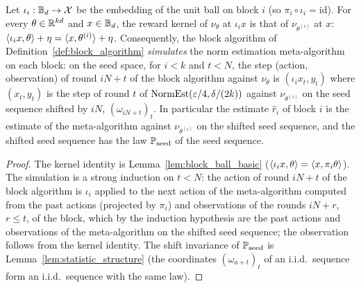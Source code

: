 \begin{lemma}\label{lem:separation_block_embedding}
\leanok
{}
Let $\iota_i : \mathbb{B}_d \to \mathcal{X}$ be the embedding of the unit ball on block $i$ (so
$\pi_i \circ \iota_i = \mathrm{id}$). For every $\theta \in \mathbb{R}^{kd}$ and $x \in \mathbb{B}_d$, the
reward kernel of $\nu_\theta$ at $\iota_i x$ is that of $\nu_{\theta^{(i)}}$ at $x$:
$\langle \iota_i x, \theta \rangle + \eta = \langle x, \theta^{(i)} \rangle + \eta$. Consequently, the block
algorithm of Definition~\ref{def:block_algorithm} \emph{simulates} the norm estimation
meta-algorithm on each block: on the seed space, for $i < k$ and $t < N$, the step
(action, observation) of round $iN + t$ of the block algorithm against $\nu_\theta$ is
$(\iota_i x_t, y_t)$ where $(x_t, y_t)$ is the step of round $t$ of
$\mathrm{NormEst}(\varepsilon/4, \delta/(2k))$ against $\nu_{\theta^{(i)}}$ on the seed sequence shifted
by $iN$, $(\omega_{iN + t})_t$. In particular the estimate $\hat r_i$ of block $i$ is the
estimate of the meta-algorithm against $\nu_{\theta^{(i)}}$ on the shifted seed sequence, and the
shifted seed sequence has the law $\mathbb{P}_{\mathrm{seed}}$ of the seed sequence.
\end{lemma}

\begin{proof}
\leanok
{}
The kernel identity is Lemma~\ref{lem:block_ball_basic} ($\langle \iota_i x, \theta \rangle = \langle x, \pi_i\theta \rangle$).
The simulation is a strong induction on $t < N$: the action of round $iN + t$ of the block
algorithm is $\iota_i$ applied to the next action of the meta-algorithm computed from the past
actions (projected by $\pi_i$) and observations of the rounds $iN + r$, $r \le t$, of the
block, which by the induction hypothesis are the past actions and observations of the
meta-algorithm on the shifted seed sequence; the observation follows from the kernel
identity. The shift invariance of $\mathbb{P}_{\mathrm{seed}}$ is Lemma~\ref{lem:statistic_structure}
(the coordinates $(\omega_{a + t})_t$ of an i.i.d.\ sequence form an i.i.d.\ sequence with the
same law).
\end{proof}

